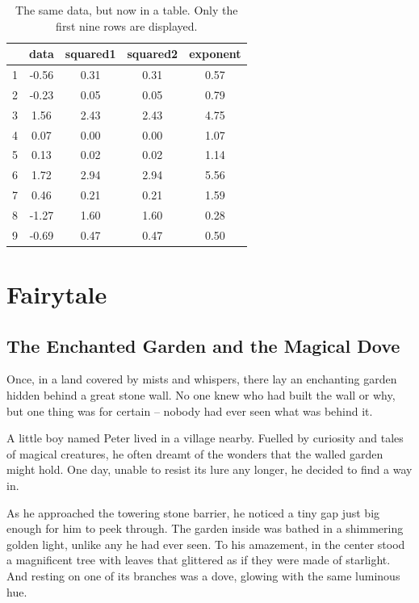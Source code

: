 \documentclass[10pt, fullpage, a4paper, titlepage]{article}
\begin{document}
\begin{table}[ht]
\centering
\caption{The same data, but now in a table. Only the first nine rows are displayed.}

\begin{tabular}{c c c c c}
\hline
 & data & squared1 & squared2 & exponent \\
\hline
1 & -0.56 & 0.31 & 0.31 & 0.57 \\
2 & -0.23 & 0.05 & 0.05 & 0.79 \\
3 & 1.56 & 2.43 & 2.43 & 4.75 \\
4 & 0.07 & 0.00 & 0.00 & 1.07 \\
5 & 0.13 & 0.02 & 0.02 & 1.14 \\
6 & 1.72 & 2.94 & 2.94 & 5.56 \\
7 & 0.46 & 0.21 & 0.21 & 1.59 \\
8 & -1.27 & 1.60 & 1.60 & 0.28 \\
9 & -0.69 & 0.47 & 0.47 & 0.50 \\
\hline
\end{tabular}

\end{table}


\newpage

\section{Fairytale}

\subsection{The Enchanted Garden and the Magical Dove}

Once, in a land covered by mists and whispers, there lay an enchanting garden hidden behind a great stone wall. No one knew who had built the wall or why, but one thing was for certain – nobody had ever seen what was behind it.

A little boy named Peter lived in a village nearby. Fuelled by curiosity and tales of magical creatures, he often dreamt of the wonders that the walled garden might hold. One day, unable to resist its lure any longer, he decided to find a way in.

As he approached the towering stone barrier, he noticed a tiny gap just big enough for him to peek through. The garden inside was bathed in a shimmering golden light, unlike any he had ever seen. To his amazement, in the center stood a magnificent tree with leaves that glittered as if they were made of starlight. And resting on one of its branches was a dove, glowing with the same luminous hue.
\end{document}
